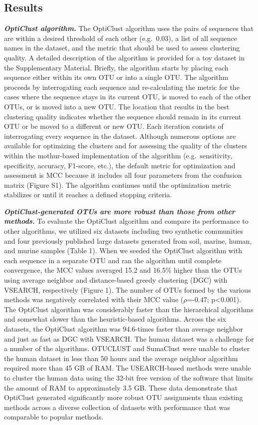 \documentclass[11pt,]{article}
\begin{document}
\subsection{Results}\label{results}

\textbf{\emph{OptiClust algorithm.}} The OptiClust algorithm uses the
pairs of sequences that are within a desired threshold of each other
(e.g.~0.03), a list of all sequence names in the dataset, and the metric
that should be used to assess clustering quality. A detailed description
of the algorithm is provided for a toy dataset in the Supplementary
Material. Briefly, the algorithm starts by placing each sequence either
within its own OTU or into a single OTU. The algorithm proceeds by
interrogating each sequence and re-calculating the metric for the cases
where the sequence stays in its current OTU, is moved to each of the
other OTUs, or is moved into a new OTU. The location that results in the
best clustering quality indicates whether the sequence should remain in
its current OTU or be moved to a different or new OTU. Each iteration
consists of interrogating every sequence in the dataset. Although
numerous options are available for optimizing the clusters and for
assessing the quality of the clusters within the mothur-based
implementation of the algorithm (e.g.~sensitivity, specificity,
accuracy, F1-score, etc.), the default metric for optimization and
assessment is MCC because it includes all four parameters from the
confusion matrix (Figure S1). The algorithm continues until the
optimization metric stabilizes or until it reaches a defined stopping
criteria.

\textbf{\emph{OptiClust-generated OTUs are more robust than those from
other methods.}} To evaluate the OptiClust algorithm and compare its
performance to other algorithms, we utilized six datasets including two
synthetic communities and four previously published large datasets
generated from soil, marine, human, and murine samples (Table 1). When
we seeded the OptiClust algorithm with each sequence in a separate OTU
and ran the algorithm until complete convergence, the MCC values
averaged 15.2 and 16.5\% higher than the OTUs using average neighbor and
distance-based greedy clustering (DGC) with VSEARCH, respectively
(Figure 1). The number of OTUs formed by the various methods was
negatively correlated with their MCC value (\(\rho\)=-0.47;
p\textless{}0.001). The OptiClust algorithm was considerably faster than
the hierarchical algorithms and somewhat slower than the heuristic-based
algorithms. Across the six datasets, the OptiClust algorithm was
94.6-times faster than average neighbor and just as fast as DGC with
VSEARCH. The human dataset was a challenge for a number of the
algorithms. OTUCLUST and SumaClust were unable to cluster the human
dataset in less than 50 hours and the average neighbor algorithm
required more than 45 GB of RAM. The USEARCH-based methods were unable
to cluster the human data using the 32-bit free version of the software
that limits the amount of RAM to approximately 3.5 GB. These data
demonstrate that OptiClust generated significantly more robust OTU
assignments than existing methods across a diverse collection of
datasets with performance that was comparable to popular methods.
\end{document}
